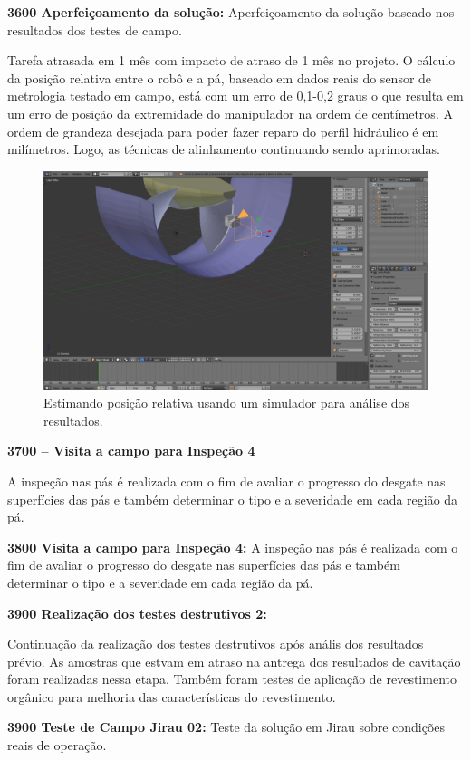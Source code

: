 \noindent
\textbf{3600 Aperfeiçoamento da solução:}
Aperfeiçoamento da solução baseado nos resultados dos testes de campo. 

Tarefa atrasada em 1 mês com impacto de atraso de 1 mês no projeto. O cálculo da
posição relativa entre o robô e a pá, baseado em dados reais do sensor de
metrologia testado em campo, está com um erro de 0,1-0,2 graus o que resulta em
um erro de posição da extremidade do manipulador na ordem de centímetros. A
ordem de grandeza desejada para poder fazer reparo do perfil hidráulico é em
milímetros. Logo, as técnicas de alinhamento continuando sendo aprimoradas.

\begin{figure}\centering
\includegraphics[width=0.6\columnwidth]{figs/blensor_screen}
\caption{Estimando posição relativa usando um simulador para análise dos
resultados.}
\end{figure} 



\noindent
\textbf{3700 – Visita a campo para Inspeção 4}

A inspeção nas pás é realizada com o fim de avaliar o progresso do desgate nas superfícies das
pás e também determinar o tipo e a severidade em cada região da pá.

\noindent
\textbf{3800  Visita a campo para Inspeção 4:}
A inspeção nas pás é realizada com o fim de avaliar o progresso do desgate nas superfícies das pás e também determinar o tipo e a severidade em cada região da pá. 

\noindent
\textbf{3900 Realização dos testes destrutivos 2:}

Continuação da realização dos testes destrutivos após anális dos resultados prévio. As amostras que estvam em atraso na antrega dos resultados de cavitação foram realizadas nessa etapa. Também foram testes de aplicação de revestimento orgânico para melhoria das características do revestimento.


\noindent
\textbf{3900 Teste de Campo Jirau 02:} Teste da solução  em Jirau sobre
condições reais de operação.

